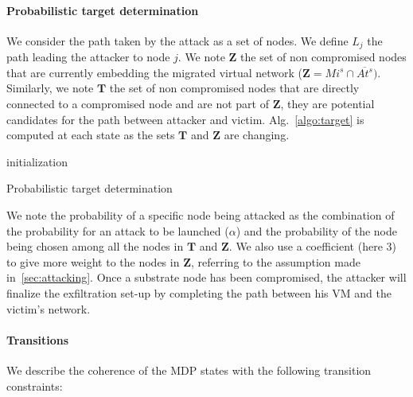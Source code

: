 \paragraph{Probabilistic target determination}
\label{sec:target_proba}
We consider the path taken by the attack as a set of nodes.
We define $L_j$ the path leading the attacker to node $j$.
We note $\textbf{Z}$ the set of non compromised nodes that are currently embedding the migrated virtual network (\ie $\textbf{Z} = Mi^s \cap \overline{At^s})$.
Similarly, we note $\textbf{T}$ the set of non compromised nodes that are directly connected to a compromised node and are not part of $\textbf{Z}$, \ie they are potential candidates for the path between attacker and victim. Alg.~\ref{algo:target} is computed at each state as the sets $\textbf{T}$ and $\textbf{Z}$ are changing.
\begin{algorithm}[]
 initialization\;
 \caption{Probabilistic target determination}
 \label{algo:target}
\end{algorithm}


We note the probability of a specific node being attacked as the combination of the probability for an attack to be launched (\ie $\alpha$) and the probability of the node being chosen among all the nodes in $\textbf{T}$ and $\textbf{Z}$. We also use a coefficient (here 3) to give more weight to the nodes in $\textbf{Z}$, referring to the assumption made in~\ref{sec:attacking}.
Once a substrate node has been compromised, the attacker will finalize the exfiltration set-up by completing the path between his VM and the victim's network.


\paragraph{Transitions}
We describe the coherence of the MDP states with the following transition constraints:

